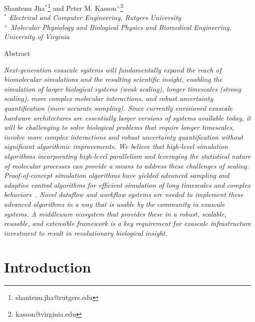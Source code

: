 \documentclass[10pt,letterpaper,draft]{article}
\begin{document}
\thispagestyle{empty}
\begin{center} 

\vspace{0.25in}
\large Shantenu Jha$^{*}$\footnote{shantenu.jha@rutgers.edu} and Peter M. Kasson$^{+}$\footnote{kasson@virginia.edu}\\

\small {\it $^*$ Electrical and Computer Engineering, Rutgers University} \\
\small {\it $^+$ Molecular Physiology and Biological Physics and Biomedical
  Engineering, University of Virginia} \\

\vspace{0.25in}

\large Abstract

\end{center} {\it Next-generation exascale systems will fundamentally expand the
  reach of biomolecular simulations and the resulting scientific insight,
  enabling the simulation of larger biological systems (weak scaling), longer
  timescales (strong scaling), more complex molecular interactions, and robust
  uncertainty quantification (more accurate sampling).  Since currently
  envisioned exascale hardware architectures are essentially larger versions of
  systems available today, it will be challenging to solve biological problems
  that require longer timescales, involve more complex interactions and robust
  uncertainty quantification without significant algorithmic improvements.  We
  believe that high-level simulation algorithms incorporating high-level
  parallelism and leveraging the statistical nature of molecular processes can
  provide a means to address these challenges of scaling.  Proof-of-concept
  simulation algorithms have yielded advanced sampling and adaptive control
  algorithms for efficient simulation of long timescales and complex
  behaviors~\cite{kasson1}. Novel dataflow and workflow systems are needed to
  implement these advanced algorithms in a way that is usable by the community
  in exascale systems. A middleware ecosystem that provides these in a robust,
  scalable, reusable, and extensible framework is a key requirement for exascale
  infrastructure investment to result in revolutionary biological insight.  }

\vspace{0.15in}

\section*{Introduction}
\end{document}
